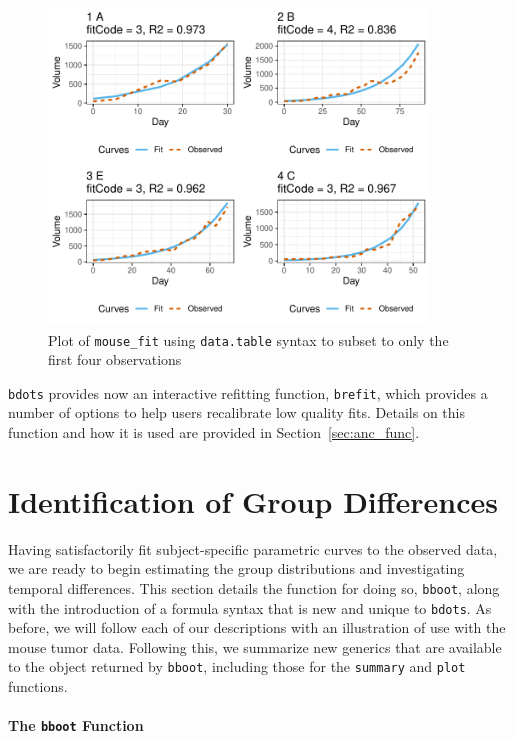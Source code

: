 \documentclass{article}
\newcommand{\xt}{\texttt}%
\begin{document}
\begin{figure}[H]
\centering
\includegraphics[width=0.9\textwidth]{img/mouse_fit.pdf}
\caption{Plot of \xt{mouse\_fit} using  \xt{data.table} syntax to subset to only the first four observations}
\label{fig:plot_fits}
\end{figure}
\xt{bdots} provides now an interactive refitting function, \xt{brefit}, which provides a number of options to help users recalibrate low quality fits. Details on this function and how it is used are provided in Section~\ref{sec:anc_func}.


\section{Identification of Group Differences}

Having satisfactorily fit subject-specific parametric curves to the observed data, we are ready to begin estimating the group distributions and investigating temporal differences. This section details the function for doing so, \xt{bboot}, along with the introduction of a formula syntax that is new and unique to \xt{bdots}. As before, we will follow each of our descriptions with an illustration of use with the mouse tumor data. Following this, we summarize new generics that are available to the object returned by \xt{bboot}, including those for the \xt{summary} and \xt{plot} functions.


\paragraph{The \xt{bboot} Function}
\end{document}
